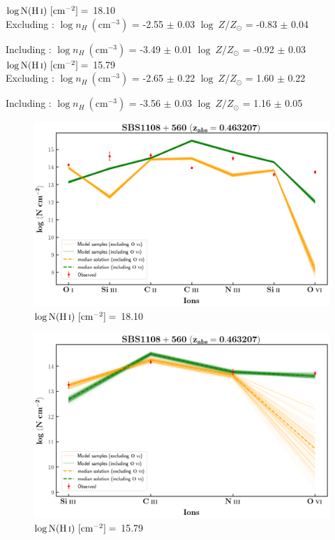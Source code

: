   
  $\log \text{N}(\ion{H}{i}) \ [\text{cm}^{-2}]=$ 18.10 \\
  
  Excluding  : $\log n_H \ (\text{cm}^{-3})$ = -2.55 $\pm$ 0.03 \hspace{10mm} $\log \ Z/Z_\odot$ = -0.83 $\pm$ 0.04
  
  Including  : $\log n_H \ (\text{cm}^{-3})$ = -3.49 $\pm$ 0.01 \hspace{10mm} $\log \ Z/Z_\odot$ = -0.92 $\pm$ 0.03
  \\
  
  $\log \text{N}(\ion{H}{i}) \ [\text{cm}^{-2}]=$ 15.79 \\
  
  Excluding  : $\log n_H \ (\text{cm}^{-3})$ = -2.65 $\pm$ 0.22 \hspace{10mm} $\log \ Z/Z_\odot$ = 1.60 $\pm$ 0.22
  
  Including  : $\log n_H \ (\text{cm}^{-3})$ = -3.56 $\pm$ 0.03 \hspace{10mm} $\log \ Z/Z_\odot$ = 1.16 $\pm$ 0.05
  
  
  \newpage
  
  \begin{figure}[!h]
    \centering
    \includegraphics[width=0.9\linewidth]{Ionisation-Modelling-Plots/sbs1108-z=0.463207-compIII_logZ=1.png}
    \caption{$\log \text{N}(\ion{H}{i}) \ [\text{cm}^{-2}]=$ 18.10}
  \end{figure}
  
  
  \begin{figure}[!b]
      \centering
      \includegraphics[width=0.9\linewidth]{Ionisation-Modelling-Plots/sbs1108-z=0.463207-compII_logZ=-1.png}
      \caption{$\log \text{N}(\ion{H}{i}) \ [\text{cm}^{-2}]=$ 15.79}
  \end{figure}
  
